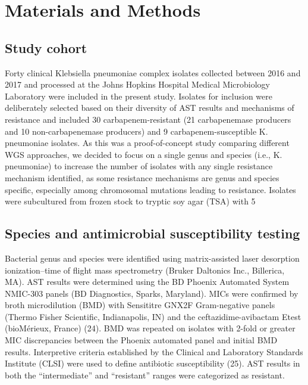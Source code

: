 \section{Materials and Methods}
\label{sec:methods}

\subsection{Study cohort}
\label{sec:cohort}

Forty clinical Klebsiella pneumoniae complex isolates collected between 2016 and 2017 and processed at the Johns Hopkins Hospital Medical Microbiology Laboratory were included in the present study. Isolates for inclusion were deliberately selected based on their diversity of AST results and mechanisms of resistance and included 30 carbapenem-resistant (21 carbapenemase producers and 10 non-carbapenemase producers) and 9 carbapenem-susceptible K. pneumoniae isolates. As this was a proof-of-concept study comparing different WGS approaches, we decided to focus on a single genus and species (i.e., K. pneumoniae) to increase the number of isolates with any single resistance mechanism identified, as some resistance mechanisms are genus and species specific, especially among chromosomal mutations leading to resistance. Isolates were subcultured from frozen stock to tryptic soy agar (TSA) with 5%

\subsection{Species and antimicrobial susceptibility testing}
\label{sec:ast}

Bacterial genus and species were identified using matrix-assisted laser desorption ionization–time of flight mass spectrometry (Bruker Daltonics Inc., Billerica, MA). AST results were determined using the BD Phoenix Automated System NMIC-303 panels (BD Diagnostics, Sparks, Maryland). MICs were confirmed by broth microdilution (BMD) with Sensititre GNX2F Gram-negative panels (Thermo Fisher Scientific, Indianapolis, IN) and the ceftazidime-avibactam Etest (bioMérieux, France) (24). BMD was repeated on isolates with 2-fold or greater MIC discrepancies between the Phoenix automated panel and initial BMD results. Interpretive criteria established by the Clinical and Laboratory Standards Institute (CLSI) were used to define antibiotic susceptibility (25). AST results in both the “intermediate” and “resistant” ranges were categorized as resistant.

